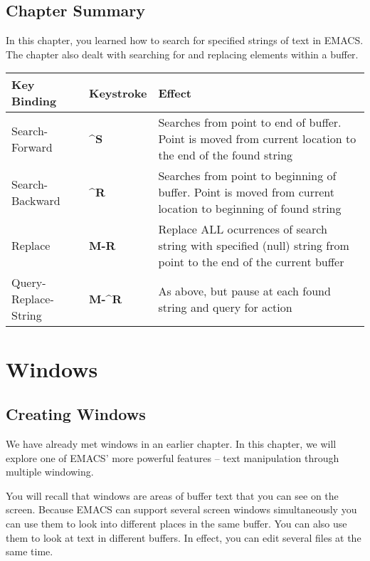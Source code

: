 \section{Chapter \thechapter{} Summary}

In this chapter, you learned how to search for specified strings of text
in EMACS.  The chapter also dealt with searching for and replacing
elements within a buffer.

\begin{tabular}{llp{4in}}
Key Binding & Keystroke & Effect \\ \hline

Search-Forward & {\bf{}\^{}S} & Searches from point to end of buffer.
Point is moved from current location to
the end of the found string \\

Search-Backward & {\bf{}\^{}R} & Searches from point to beginning of
buffer.  Point is moved from current location to beginning of found
string \\

Replace & {\bf{}M-R} & Replace ALL ocurrences of search string with
specified (null) string from point to the
end of the current buffer \\

Query-Replace-String & {\bf{}M-\^{}R} & As above, but pause at each
found string and query for action \\

\end{tabular}

\chapter{Windows}

\section{Creating Windows}

We have already met windows in an earlier chapter.  In this chapter, we
will explore one of EMACS' more powerful features -- text manipulation
through multiple windowing.

You will recall that windows are areas of buffer text that you can see
 on the screen.  Because EMACS can support several screen
windows simultaneously you can use them to look into different places in
the same buffer.  You can also use them to look at text in different
buffers.  In effect, you can edit several files at the same time.

